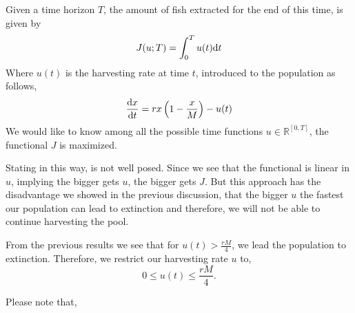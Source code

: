 Given a time horizon $T$, the amount of fish extracted for the end of this time, is given by
\begin{equation}
	J(u;T)=\int_{0}^{T} u(t)\mathrm{d} t
\end{equation}
Where $u(t)$ is the harvesting rate at time $t$, introduced to the population as follows,
\begin{equation}
	\frac{\mathrm{d} x}{{\mathrm{d} t}}=rx\left(1-\frac{x}{M}\right)-u(t) \label{eq: HarvestOpenLoop}
\end{equation}
We would like to know among all the possible time functions $u\in \mathbb{R}^{[0,T]}$, the functional $J$ is maximized. 

Stating in this way, is not well posed. Since we see that the functional is linear in $u$, implying the bigger gets $u$, the bigger gets $J$. But this approach has the disadvantage we showed in the previous discussion, that the bigger $u$ the fastest our population can lead to extinction and therefore, we will not be able to continue harvesting the pool. 

From the previous results we see that for $u(t)>\frac{rM}{4}$, we lead the population to extinction. Therefore, we restrict our harvesting rate $u$ to,
\begin{equation}
0\leq u(t)\leq\frac{rM}{4}.
\end{equation}

Please note that,
